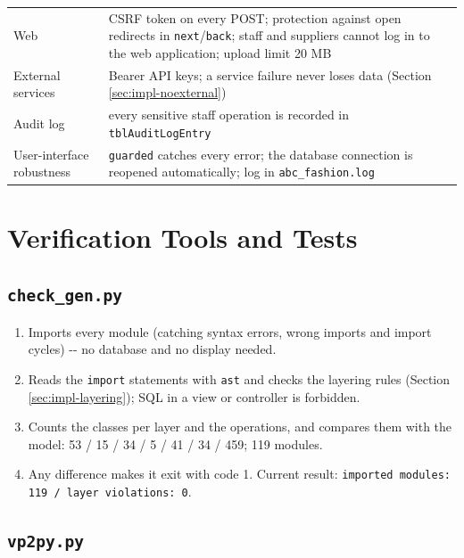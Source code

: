 {\begin{longtable}{@{}
  >{\raggedright\arraybackslash}p{}
  >{\raggedright\arraybackslash}p{}@{}}
Web & CSRF token on every POST; protection against open redirects in
\texttt{next}/\texttt{back}; staff and suppliers cannot log in to the
web application; upload limit 20 MB \\
External services & Bearer API keys; a service failure never loses data
(Section \ref{sec:impl-noexternal}) \\
Audit log & every sensitive staff operation is recorded in
\texttt{tblAuditLogEntry} \\
User-interface robustness & \texttt{guarded} catches every error; the
database connection is reopened automatically; log in
\texttt{abc\_\allowbreak{}fashion.\allowbreak{}log} \\
\end{longtable}}

\hypertarget{verification-tools-and-tests}{%
\section{Verification Tools and
Tests}\label{verification-tools-and-tests}}

\hypertarget{check_gen.py}{%
\subsection{\texorpdfstring{\texttt{check\_\allowbreak{}gen.\allowbreak{}py}}{check\_gen.py}}\label{check_gen.py}}

\begin{enumerate}
\def\labelenumi{\arabic{enumi}.}
\tightlist
\item
  Imports every module (catching syntax errors, wrong imports and import
  cycles) -\/- no database and no display needed.
\item
  Reads the \texttt{import} statements with \texttt{ast} and checks the
  layering rules (Section \ref{sec:impl-layering}); SQL in a view or
  controller is forbidden.
\item
  Counts the classes per layer and the operations, and compares them
  with the model: 53 / 15 / 34 / 5 / 41 / 34 / 459; 119 modules.
\item
  Any difference makes it exit with code 1. Current result:
  \texttt{imported modules: 119 /\allowbreak{} layer violations: 0}.
\end{enumerate}

\hypertarget{vp2py.py}{%
\subsection{\texorpdfstring{\texttt{vp2py.\allowbreak{}py}}{vp2py.py}}\label{vp2py.py}}

